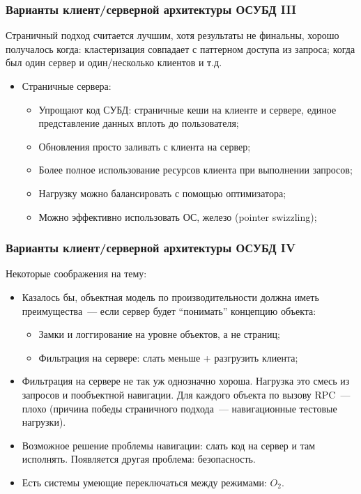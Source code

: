 \documentclass{beamer}
\begin{document}


\begin{frame}
\frametitle{Варианты клиент/серверной архитектуры ОСУБД III}

Страничный подход считается лучшим, хотя результаты не финальны, хорошо получалось когда: кластеризация совпадает с паттерном доступа из запроса; когда был \alert{один сервер} и один/несколько клиентов и т.д.

\begin{itemize}
  \item Страничные сервера:
  \begin{itemize}
    \setlength\itemsep{1em}
    \item Упрощают код СУБД: страничные кеши на клиенте и сервере, единое представление данных вплоть до пользователя;
    \item Обновления просто заливать с клиента на сервер;
    \item Более полное использование ресурсов клиента при выполнении запросов;
    \item Нагрузку можно балансировать с помощью оптимизатора;
    \item Можно эффективно использовать ОС, железо (pointer swizzling);
  \end{itemize}  

\end{itemize}
\end{frame}

\begin{frame}
\frametitle{Варианты клиент/серверной архитектуры ОСУБД IV}

Некоторые соображения на тему:
\begin{itemize}
  \item Казалось бы, объектная модель по производительности должна иметь преимущества~--- если сервер будет ``понимать'' концепцию объекта:
  \begin{itemize}
    \item Замки и логгирование на уровне объектов, а не страниц;
    \item Фильтрация на сервере: слать меньше + разгрузить клиента;
  \end{itemize}
  \item Фильтрация на сервере не так уж однозначно хороша. Нагрузка это смесь из запросов и пообъектной навигации. Для каждого объекта по вызову RPC~--- плохо (причина победы страничного подхода~--- навигационные тестовые нагрузки).
  \item Возможное решение проблемы навигации: слать код на сервер и там исполнять. Появляется другая проблема: безопасность.
  \item Есть системы умеющие переключаться между режимами: $O_2$.
\end{itemize}
\end{frame}
\end{document}
